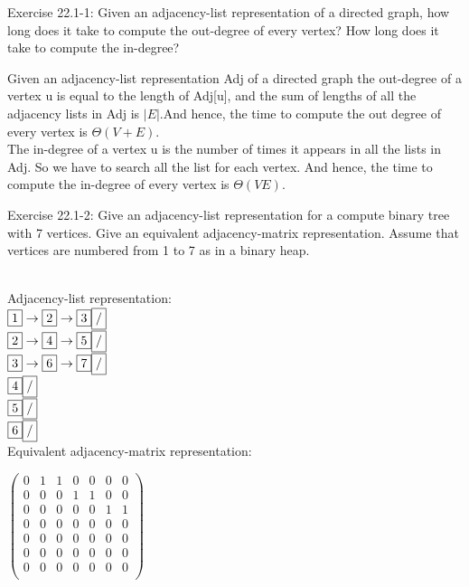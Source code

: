 \documentclass[addpoints,11pt]{exam}
\begin{document}
\begin{questions}


\question[5] Exercise 22.1-1:  Given an adjacency-list representation of a directed graph, how long does it take to compute the out-degree of every vertex?  How long does it take to compute the in-degree?
\begin{solutionorbox}
	Given an adjacency-list representation Adj of a directed graph the out-degree of a vertex u is equal to the length of Adj[u], and the sum of lengths of all the adjacency lists in Adj is $|E|$.And hence, the time to compute the out degree of every vertex is $\Theta(V + E)$. \\
	The in-degree of a vertex u is the number of times it appears in all the lists in Adj. So we have to search all the list for each vertex. And hence, the time to compute the in-degree of every vertex is $\Theta(VE)$.
\end{solutionorbox}

\ifprintanswers
\newpage
\else
\bigskip
\fi



\question[5] Exercise 22.1-2: Give an adjacency-list representation for a compute binary tree with 7 vertices.  Give an equivalent adjacency-matrix representation.  Assume that vertices are numbered from 1 to 7 as in a binary heap.
\begin{solutionorbox}	
\\  Adjacency-list representation: \\
$\fbox{1}\rightarrow\fbox{2}\rightarrow\fbox{3}\fbox{/}$\\
$\fbox{2}\rightarrow\fbox{4}\rightarrow\fbox{5}\fbox{/}$\\
$\fbox{3}\rightarrow\fbox{6}\rightarrow\fbox{7}\fbox{/}$\\
$\fbox{4}\fbox{/}$\\
$\fbox{5}\fbox{/}$\\
$\fbox{6}\fbox{/}$\\


Equivalent adjacency-matrix representation: 

$\begin{pmatrix}
0 & 1 & 1 & 0 & 0 & 0 & 0 \\
0 & 0 & 0 & 1 & 1 & 0 & 0 \\
0 & 0 & 0 & 0 & 0 & 1 & 1 \\
0 & 0 & 0 & 0 & 0 & 0 & 0 \\
0 & 0 & 0 & 0 & 0 & 0 & 0 \\
0 & 0 & 0 & 0 & 0 & 0 & 0 \\
0 & 0 & 0 & 0 & 0 & 0 & 0 \\
\end{pmatrix}$



\end{solutionorbox}
\end{questions}
\end{document}
